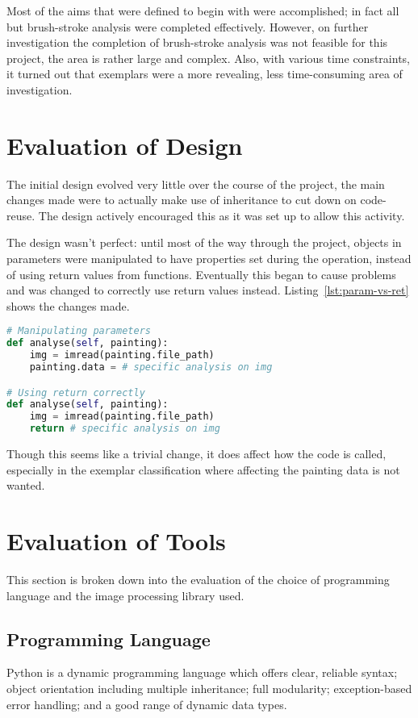 Most of the aims that were defined to begin with were accomplished; in fact all but brush-stroke 
analysis were completed effectively. However, on further investigation the completion of 
brush-stroke analysis was not feasible for this project, the area is rather large and complex.
Also, with various time constraints, it turned out that exemplars were a more revealing, less 
time-consuming area of investigation.


\section{Evaluation of Design}
The initial design evolved very little over the course of the project, the main changes made were
to actually make use of inheritance to cut down on code-reuse. The design actively encouraged
this as it was set up to allow this activity.

The design wasn't perfect: until most of the way through the project, objects in parameters were 
manipulated to have properties set during the operation, instead of using return values from 
functions. Eventually this began to cause problems and was changed to correctly use return values
instead. Listing~\ref{lst:param-vs-ret} shows the changes made.

\begin{lstlisting}[caption={Using return values instead of manipulating parameters},
label=lst:param-vs-ret,
breaklines=true,
language=python,
frame=single]
# Manipulating parameters
def analyse(self, painting):
    img = imread(painting.file_path)
    painting.data = # specific analysis on img

# Using return correctly
def analyse(self, painting):
    img = imread(painting.file_path)
    return # specific analysis on img
\end{lstlisting}

Though this seems like a trivial change, it does affect how the code is called, especially in the
exemplar classification where affecting the painting data is not wanted.


\section{Evaluation of Tools}
This section is broken down into the evaluation of the choice of programming language and the 
image processing library used.

\subsection{Programming Language}
Python is a dynamic programming language which offers clear, reliable syntax; object orientation
including multiple inheritance; full modularity; exception-based error handling; and a good range
of dynamic data types.

